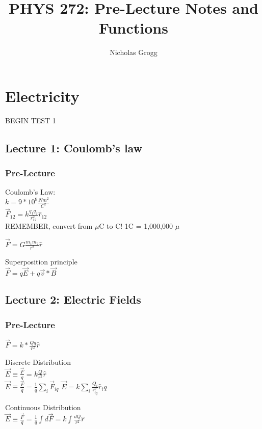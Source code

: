 \documentclass{article}
\title{PHYS 272: Pre-Lecture Notes and Functions}
\author{Nicholas Grogg}
\begin{document}
\maketitle

\section{Electricity}
BEGIN TEST 1
\subsection{Lecture 1: Coulomb's law}

\subsubsection{Pre-Lecture}
\noindent
Coulomb's Law: \\
$k = 9*10^9 \frac{Nm^2}{C^2}$ \\
$\vec{F}_{12} = k\frac{q_1 q_2}{r^{2}_{12}}\hat{r}_12$\\
REMEMBER, convert from $\mu$C to C! 1C = 1,000,000 $\mu$

$\vec{F} = G\frac{m_1 m_2}{r^2}\hat{r}$

\vspace{2mm}

\noindent
Superposition principle\\
$\vec{F} = q\vec{E} + q\vec{v} * \vec{B}$

\vspace{2mm}

\subsection{Lecture 2: Electric Fields}

\subsubsection{Pre-Lecture}
\noindent 
$\vec{F} = k*\frac{Qq}{r^2}\hat{r}$

\vspace{2mm}
\noindent
Discrete Distribution \\
$\vec{E} \equiv \frac{\vec{F}}{q} = k \frac{Q}{r^2}\hat{r}$ \\
$\vec{E} \equiv \frac{\vec{F}}{q} = \frac{1}{q} \sum^{}_{i} \vec{F}_{iq}$ 
$\vec{E} = k \sum^{}_{i} \frac{Q_i}{r^2_{iq}} \hat{r}_iq$

\vspace{2mm}
\noindent
Continuous Distribution \\
$\vec{E} \equiv \frac{\vec{F}}{q} = \frac{1}{q} \int d\vec{F} = k \int \frac{dQ}{r^2}\hat{r}$
\end{document}
